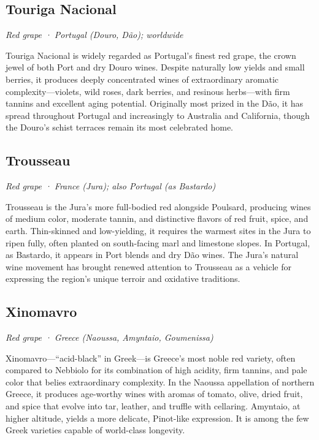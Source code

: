\subsection*{Touriga Nacional}
\textit{Red grape · Portugal (Douro, Dão); worldwide}\par\smallskip

Touriga Nacional is widely regarded as Portugal’s finest red grape, the crown jewel of both Port and dry Douro wines. Despite naturally low yields and small berries, it produces deeply concentrated wines of extraordinary aromatic complexity—violets, wild roses, dark berries, and resinous herbs—with firm tannins and excellent aging potential. Originally most prized in the Dão, it has spread throughout Portugal and increasingly to Australia and California, though the Douro’s schist terraces remain its most celebrated home.

\subsection*{Trousseau}
\textit{Red grape · France (Jura); also Portugal (as Bastardo)}\par\smallskip

Trousseau is the Jura’s more full-bodied red alongside Poulsard, producing wines of medium color, moderate tannin, and distinctive flavors of red fruit, spice, and earth. Thin-skinned and low-yielding, it requires the warmest sites in the Jura to ripen fully, often planted on south-facing marl and limestone slopes. In Portugal, as Bastardo, it appears in Port blends and dry Dão wines. The Jura’s natural wine movement has brought renewed attention to Trousseau as a vehicle for expressing the region’s unique terroir and oxidative traditions.

\subsection*{Xinomavro}
\textit{Red grape · Greece (Naoussa, Amyntaio, Goumenissa)}\par\smallskip

Xinomavro—“acid-black” in Greek—is Greece’s most noble red variety, often compared to Nebbiolo for its combination of high acidity, firm tannins, and pale color that belies extraordinary complexity. In the Naoussa appellation of northern Greece, it produces age-worthy wines with aromas of tomato, olive, dried fruit, and spice that evolve into tar, leather, and truffle with cellaring. Amyntaio, at higher altitude, yields a more delicate, Pinot-like expression. It is among the few Greek varieties capable of world-class longevity.

